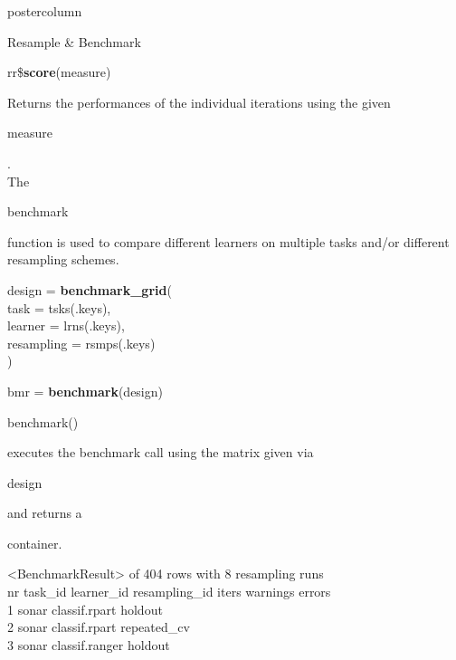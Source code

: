 \documentclass{beamer}
\newcommand{\codeinline}[1]{\begin{codeboxinline}#1\end{codeboxinline}}
\begin{document}
\begin{frame}[fragile]{}
\begin{columns}
\begin{column}{.245\textwidth}
\begin{beamercolorbox}[center]{postercolumn}
\begin{minipage}{.98\textwidth}
{\begin{myblock}{Resample \& Benchmark}
							\\
							\begin{codebox}
								rr\$\textbf{score}(measure)
							\end{codebox}
							Returns the performances of the individual iterations using the given \codeinline{measure}.
							\vspace{2em}
							\\
							The \codeinline{benchmark} function is used to compare different learners on multiple tasks and/or different resampling schemes.
							\\
							\begin{codeboxmultiline}[width=21.95cm]
								design = \textbf{benchmark\_grid}(\\
								\hspace*{1ex}task = tsks(.keys),\\
								\hspace*{1ex}learner = lrns(.keys),\\
								\hspace*{1ex}resampling = rsmps(.keys)\\
								)
							\end{codeboxmultiline}
							\begin{codebox}
								bmr = \textbf{benchmark}(design)
							\end{codebox}
							\codeinline{benchmark()} executes the benchmark call
							using the matrix given via \codeinline{design} and
							returns a \codeinline{}
							container.
							\begin{codeboxmultiline}[width=27cm]
								\scriptsize{
								<BenchmarkResult> of 404 rows with 8 resampling runs\\
								nr task\_id \space\space\space\space learner\_id resampling\_id iters warnings errors\\
								1 \space\space\space sonar \space classif.rpart
								\space\space\space\space\space\space holdout
								\space\space\space\space 1
								\space\space\space\space\space\space\space 0
								\space\space\space\space\space 0\\
								2 \space\space\space sonar \space classif.rpart
								\space\space repeated\_cv
								\space{}00
								\space\space\space\space\space\space{}
								\space\space\space\space{}\\
								3 \space\space\space sonar classif.ranger
								\space\space\space\space\space\space holdout
								\space\space\space\space 1
}
\end{codeboxmultiline}
\end{myblock}}
\end{minipage}
\end{beamercolorbox}
\end{column}
\end{columns}
\end{frame}
\end{document}
